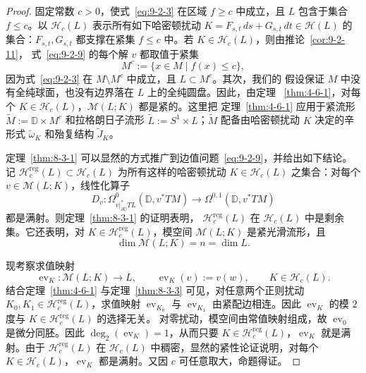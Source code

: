 \begin{proof}
固定常数 $c>0$，使式~\eqref{eq:9-2-3} 在区域 $f\ge c$ 中成立，且 $L$ 包含于集合
$f\le c$。以 $\mathcal H_c(L)$ 表示所有如下哈密顿扰动
$K=F_{s,t}\,ds+G_{s,t}\,dt\in\mathcal H(L)$ 的集合：$F_{s,t},G_{s,t}$ 都支撑在紧集
$f\le c$ 中。若 $K\in\mathcal H_c(L)$，则由推论~\ref{cor:9-2-11}，
式~\eqref{eq:9-2-9} 的每个解 $v$ 都取值于紧集
\[
  M^c:=\{x\in M\mid f(x)\le c\},
\]
因为式~\eqref{eq:9-2-3} 在 $M\setminus M^c$ 中成立，且 $L\subset M^c$。其次，我们的
假设保证 $M$ 中没有全纯球面，也没有边界落在 $L$ 上的全纯圆盘。因此，由定理
~\ref{thm:4-6-1}，对每个 $K\in\mathcal H_c(L)$，$\mathcal M(L;K)$ 都是紧的。这里把
定理~\ref{thm:4-6-1} 应用于紧流形
$\widetilde M:=\mathbb D\times M^c$ 和拉格朗日子流形
$\widetilde L:=S^1\times L$；$\widetilde M$ 配备由哈密顿扰动 $K$ 决定的辛形式
$\widetilde\omega_K$ 和殆复结构 $\widetilde J_K$。

定理~\ref{thm:8-3-1} 可以显然的方式推广到边值问题~\eqref{eq:9-2-9}，并给出如下结论。
记 $\mathcal H_c^{\mathrm{reg}}(L)\subset\mathcal H_c(L)$ 为所有这样的哈密顿扰动
$K\in\mathcal H_c(L)$ 之集合：对每个 $v\in\mathcal M(L;K)$，线性化算子
\[
  D_v:
  \Omega^0_{v|_{\partial\mathbb D}^*TL}(\mathbb D,v^*TM)
  \longrightarrow\Omega^{0,1}(\mathbb D,v^*TM)
\]
都是满射。则定理~\ref{thm:8-3-1} 的证明表明，
$\mathcal H_c^{\mathrm{reg}}(L)$ 在 $\mathcal H_c(L)$ 中是剩余集。它还表明，对
$K\in\mathcal H_c^{\mathrm{reg}}(L)$，模空间 $\mathcal M(L;K)$ 是紧光滑流形，且
\[
  \dim\mathcal M(L;K)=n=\dim L.
\]

现考察求值映射
\[
  \operatorname{ev}_K:\mathcal M(L;K)\longrightarrow L,
  \qquad \operatorname{ev}_K(v):=v(w),
  \qquad K\in\mathcal H_c(L).
\]
结合定理~\ref{thm:4-6-1} 与定理~\ref{thm:8-3-3} 可见，对任意两个正则扰动
$K_0,K_1\in\mathcal H_c^{\mathrm{reg}}(L)$，求值映射
$\operatorname{ev}_{K_0}$ 与 $\operatorname{ev}_{K_1}$ 由紧配边相连。因此
$\operatorname{ev}_K$ 的模 $2$ 度与 $K\in\mathcal H_c^{\mathrm{reg}}(L)$ 的选择无关。
对零扰动，模空间由常值映射组成，故 $\operatorname{ev}_0$ 是微分同胚。因此
$\deg_2(\operatorname{ev}_K)=1$，从而只要
$K\in\mathcal H_c^{\mathrm{reg}}(L)$，$\operatorname{ev}_K$ 就是满射。由于
$\mathcal H_c^{\mathrm{reg}}(L)$ 在 $\mathcal H_c(L)$ 中稠密，显然的紧性论证说明，对每个
$K\in\mathcal H_c(L)$，$\operatorname{ev}_K$ 都是满射。又因 $c$ 可任意取大，命题得证。
\end{proof}

